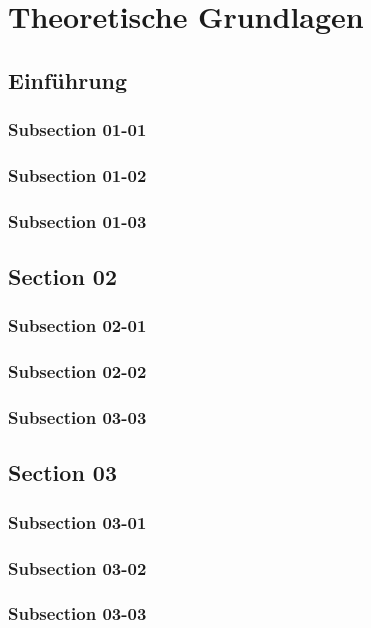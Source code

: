 \chapter{Theoretische Grundlagen}

\bt

\section{Einführung}
\bt
\subsection{Subsection 01-01}
\bt
\subsection{Subsection 01-02}
\bt 
\subsection{Subsection 01-03}

\section{Section 02}
\bt
\subsection{Subsection 02-01}
\bt
\subsection{Subsection 02-02}
\bt
\subsection{Subsection 03-03}
\bt

\section{Section 03}
\bt
\subsection{Subsection 03-01}
\bt
\subsection{Subsection 03-02}
\bt
\subsection{Subsection 03-03}
\bt

